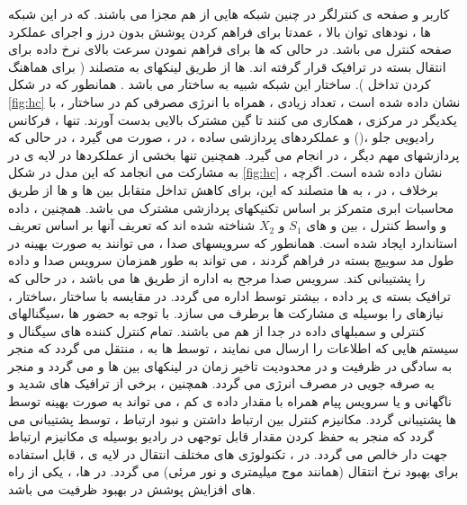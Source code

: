 \begin{itemize}
کاربر و صفحه ی کنترلگر در چنین شبکه هایی از هم مجزا می باشند. که در این شبکه ها ، نودهای توان بالا    ، عمدتا برای فراهم کردن پوشش بدون درز و اجرای عملکرد صفحه کنترل می باشد. در حالی که  ها برای فراهم نمودن سرعت بالای نرخ داده برای انتقال بسته در ترافیک قرار گرفته اند.  ها از طریق لینکهای   به  متصلند ( برای هماهنگ کردن تداخل ).\newline
ساختار این شبکه شبیه به ساختار  می باشد . همانطور که در شکل \eqref{fig:hc} نشان داده شده است ، تعداد زیادی  ، همراه با انرژی مصرفی کم در ساختار  ، با یکدیگر در  مرکزی ، همکاری می کنند تا گین مشترک بالایی بدست آورند.   تنها ، فرکانس رادیویی جلو ،() و عملکردهای پردازشی  ساده ، در  ، صورت می گیرد ، در حالی که پردازشهای مهم دیگر ، در  انجام می گیرد. همچنین تنها بخشی از عملکردها در لایه ی  در  به مشارکت می انجامد که این مدل در شکل \eqref{fig:hc} نشان داده شده است.\newline
اگرچه ، برخلاف  ،  در  ، به  ها متصلند که این، برای کاهش تداخل متقابل بین  ها و  ها از طریق محاسبات ابری متمرکز بر اساس تکنیکهای پردازشی مشترک می باشد. همچنین ، داده و واسط کنترل ، بین  و  های $S_1$ و $X_2$ شناخته شده اند که تعریف آنها بر اساس تعریف استاندارد  ایجاد شده است.\newline
همانطور که سرویسهای صدا ، می توانند به صورت بهینه در طول مد سوییچ بسته در  فراهم گردند ،  می تواند به طور همزمان سرویس صدا و داده را پشتیبانی کند. سرویس صدا مرجح به اداره از طریق  ها می باشد ، در حالی که ترافیک بسته ی پر داده ، بیشتر توسط  اداره می گردد. 
در مقایسه با ساختار  ،ساختار  ، نیازهای  را بوسیله ی مشارکت  ها برطرف می سازد. با توجه به حضور  ها ،سیگنالهای کنترلی و سمبلهای داده در  جدا از هم می باشند. تمام کنترل کننده های سیگنال و سیستم هایی که اطلاعات را ارسال می نمایند ، توسط  ها به  ، منتقل می گردد که منجر به سادگی در ظرفیت و در محدودیت تاخیر زمان در لینکهای  بین  ها و   می گردد و منجر به صرفه جویی در مصرف انرژی می گردد. همچنین ، برخی از ترافیک های شدید و ناگهانی  و یا سرویس پیام همراه با مقدار داده ی کم ، می تواند به صورت بهینه توسط  ها پشتیبانی گردد. مکانیزم کنترل بین ارتباط داشتن و نبود ارتباط ، توسط  پشتیبانی می گردد که منجر به حفظ کردن مقدار قابل توجهی  در رادیو بوسیله ی مکانیزم ارتباط جهت دار خالص می گردد. در  ، تکنولوژی های مختلف انتقال در لایه ی  ، قابل استفاده برای بهبود نرخ انتقال (همانند موج میلیمتری و نور مرئی) می گردد. در ها، ، یکی از راه های افزایش پوشش در بهبود ظرفیت می باشد.


\end{itemize}
